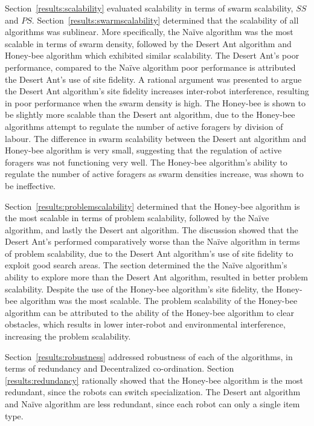 Section~\ref{results:scalability} evaluated scalability in terms of swarm scalability, $SS$ and $PS$. Section~\ref{results:swarmscalability} determined that the scalability of all algorithms was sublinear. More specifically, the Na\"ive algorithm was the most scalable in terms of swarm density, followed by the Desert Ant algorithm and Honey-bee algorithm which exhibited similar scalability. The Desert Ant's poor performance, compared to the Na\"ive algorithm poor performance is attributed the Desert Ant's use of site fidelity. A rational argument was presented to argue the Desert Ant algorithm's site fidelity increases inter-robot interference, resulting in poor performance when the swarm density is high. The Honey-bee is shown to be slightly more scalable than the Desert ant algorithm, due to the Honey-bee algorithms attempt to regulate the number of active foragers by division of labour. The difference in swarm scalability between the Desert ant algorithm and Honey-bee algorithm is very small, suggesting that the regulation of active foragers was not functioning very well. The Honey-bee algorithm's ability to regulate the number of active foragers as swarm densities increase, was shown to be ineffective. 

Section~\ref{results:problemscalability} determined that the Honey-bee algorithm is the most scalable in terms of problem scalability, followed by the Na\"ive algorithm, and lastly the Desert ant algorithm. The discussion showed that the Desert Ant's performed comparatively worse than the Na\"ive algorithm in terms of problem scalability, due to the Desert Ant algorithm's use of site fidelity to exploit good search areas. The section determined the the Na\"ive algorithm's ability to explore more than the Desert Ant algorithm, resulted in better problem scalability. Despite the use of the Honey-bee algorithm's site fidelity, the Honey-bee algorithm was the most scalable. The problem scalability of the Honey-bee algorithm can be attributed to the ability of the Honey-bee algorithm to clear obstacles, which results in lower inter-robot and environmental interference, increasing the problem scalability.

Section~\ref{results:robustness} addressed robustness of each of the algorithms, in terms of redundancy and Decentralized co-ordination. Section \ref{results:redundancy} rationally showed that the Honey-bee algorithm is the most redundant, since the robots can switch specialization. The Desert ant algorithm and Na\"ive algorithm are less redundant, since each robot can only a single item type.

